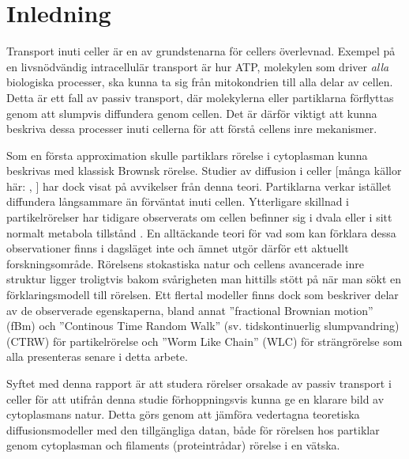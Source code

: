 \chapter{Inledning}



Transport inuti celler är en av grundstenarna för cellers överlevnad. Exempel på en livsnödvändig intracellulär transport är hur ATP, molekylen som driver \emph{alla} biologiska processer, ska kunna ta sig från mitokondrien till alla delar av cellen. Detta är ett fall av passiv transport, där molekylerna eller partiklarna förflyttas genom att slumpvis diffundera genom cellen. Det är därför viktigt att kunna beskriva dessa processer inuti cellerna för att förstå cellens inre mekanismer. 


Som en första approximation skulle partiklars rörelse i cytoplasman kunna beskrivas med klassisk Brownsk rörelse. Studier av diffusion i celler [många källor här: \cite{Gou_etal2014}, \cite{Dix_Crowdingeffects2008}] har dock visat på avvikelser från denna teori. Partiklarna verkar istället diffundera långsammare än förväntat inuti cellen. Ytterligare skillnad i partikelrörelser har tidigare observerats om cellen befinner sig i dvala eller i sitt normalt metabola tillstånd \cite{}. En alltäckande teori för vad som kan förklara dessa observationer finns i dagsläget inte och ämnet utgör därför ett aktuellt forskningsområde.
Rörelsens stokastiska natur och cellens avancerade inre struktur ligger troligtvis bakom svårigheten man hittills stött på när man sökt en förklaringsmodell till rörelsen. Ett flertal modeller finns dock som beskriver delar av de observerade egenskaperna, bland annat ''fractional Brownian motion'' (fBm) \cite{Mandelbrot_fBm1968} och ''Continous Time Random Walk'' (sv. tidskontinuerlig slumpvandring) (CTRW) \cite{} för partikelrörelse och ''Worm Like Chain'' (WLC) \cite{} för strängrörelse som alla presenteras senare i detta arbete.

Syftet med denna rapport är att studera rörelser orsakade av passiv transport i celler för att utifrån denna studie förhoppningsvis kunna ge en klarare bild av cytoplasmans natur. Detta görs genom att jämföra vedertagna teoretiska diffusionsmodeller med den tillgängliga datan, både för rörelsen hos partiklar genom cytoplasman och filaments (proteintrådar) rörelse i en vätska. %


